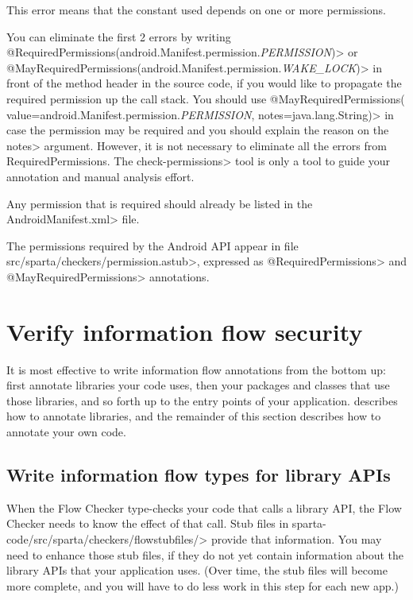 This error means that the constant used depends on one or more permissions.

You can eliminate the first 2 errors by writing
\<@RequiredPermissions({android.Manifest.permission.\emph{PERMISSION}})> or
\<@MayRequiredPermissions({android.Manifest.permission.\emph{WAKE\_LOCK}})> in
front of the method header in the source code, if you would like to propagate the
required permission up the call stack. 
You should use 
\<@MayRequiredPermissions( value={android.Manifest.permission.\emph{PERMISSION}},
notes=java.lang.String)> in case the permission may be required and you should 
explain the reason on the \<notes> argument.
However, it is not necessary to eliminate all the errors from RequiredPermissions.   
The \<check-permissions> tool is only a tool to guide your annotation and manual analysis effort. 

Any permission that is required should already be listed in the
\<AndroidManifest.xml> file.

The permissions required by the Android API appear in file
\<src/sparta/checkers/permission.astub>, expressed as
\<@RequiredPermissions> and \<@MayRequiredPermissions> annotations.




\section{Verify information flow security\label{verify-information-flow-security}}

It is most effective to write information flow annotations from the bottom
up:  first annotate libraries your code uses, then your packages and
classes that use those libraries, and so forth up to the entry points of
your application.
 describes how to annotate libraries, and
the remainder of this section describes how to annotate your own code.


\subsection{Write information flow types for library APIs\label{flow-task-annotate-apis}}

When the Flow Checker type-checks your code that calls a library API, the
Flow Checker needs to know the effect of that call.  
Stub files in \<sparta-code/src/sparta/checkers/flowstubfiles/> provide
that information.  You may need to enhance those stub files, if they do not
yet contain information about the library APIs that your application uses.
(Over time, the stub files will become more complete, and you will have to
do less work in this step for each new app.)

